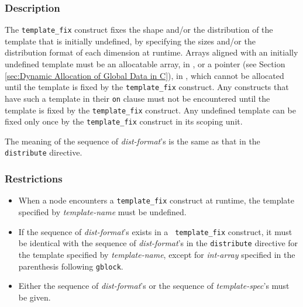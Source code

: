 \subsubsection*{Description}

The {\tt template\_fix} construct fixes the shape and/or the
distribution of the template that is initially undefined, by specifying
the sizes and/or the distribution format of 
each dimension at runtime. Arrays aligned with an initially undefined
template must be an allocatable array, in {\XMPF}, or a pointer (see
Section \ref{sec:Dynamic Allocation of Global Data in C}), in
{\XMPC}, which cannot be allocated until the template is fixed by the
{\tt template\_fix} construct. Any constructs that have such a
template in their {\tt on} clause must not be encountered until the
template is fixed by the {\tt template\_fix} construct. Any undefined
template can be fixed only once by the {\tt template\_fix} construct in
its scoping unit.

The meaning of the sequence of {\it dist-format}'s is the same
as that in the {\tt distribute} directive.

\subsubsection*{Restrictions}

\begin{itemize}
\item When a node encounters a {\tt template\_fix} construct at runtime,
      the template specified by {\it template-name} must be undefined.
\item If the sequence of {\it dist-format}'s exists in a {\tt
      template\_fix} construct, it must be identical with the 
      sequence of {\it dist-format}'s in the {\tt distribute} directive
      for the template specified by {\it template-name}, except for {\it
      int-array} specified in the parenthesis following {\tt gblock}.
\item Either the sequence of {\it dist-format}'s or the sequence of {\it
      template-spec}'s must be given. 
\end{itemize}

